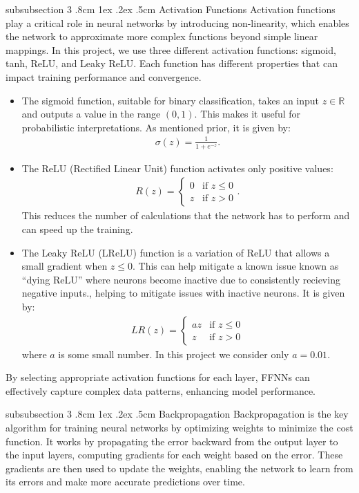 \documentclass[%
reprint,s
amsmath,amssymb,
aps,
]{revtex4-2}
\makeatletter
\renewcommand{\subsubsection}{%
	\@startsection
	{subsubsection}%
	{3}%
	{\z@}%
	{.8cm \@plus1ex \@minus .2ex}%
	{.5cm}%
	{\normalfont\small\centering}%
}
\makeatother
\begin{document}
\subsubsection{Activation Functions}
Activation functions play a critical role in neural networks by introducing non-linearity, which enables the network to approximate more complex functions beyond simple linear mappings. In this project, we use three different activation functions: sigmoid, tanh, ReLU, and Leaky ReLU. Each function has different properties that can impact training performance and convergence.
\begin{itemize}
	\item The sigmoid function, suitable for binary classification, takes an input $z\in\mathbb{R}$ and outputs a value in the range $(0,1)$. This makes it useful for probabilistic interpretations. As mentioned prior, it is given by:
	\begin{align} 
		\sigma(z)=\frac{1}{1+e^{-z}}.
	\end{align}
	\item The ReLU (Rectified Linear Unit) function activates only positive values: 
	\begin{align} 
		R(z)=
		\begin{cases}
			0 & \text{if }z\leq0\\z&\text{if }z>0
		\end{cases}.
	\end{align}
	This reduces the number of calculations that the network has to perform and can speed up the training.
	\item The Leaky ReLU (LReLU) function is a variation of ReLU that allows a small gradient when $z\leq0$. This can help mitigate a known issue known as ``dying ReLU'' where neurons become inactive due to consistently recieving negative inputs., helping to mitigate issues with inactive neurons. It is given by:
	\begin{align} 
		LR(z)=
		\begin{cases} 
			az&\text{if }z\leq0\\z&\text{if }z> 0 
		\end{cases} 
	\end{align}
	where $a$ is some small number. In this project we consider only $a=0.01$.
\end{itemize}
By selecting appropriate activation functions for each layer, FFNNs can effectively capture complex data patterns, enhancing model performance.

\subsubsection{Backpropagation}
Backpropagation is the key algorithm for training neural networks by optimizing weights to minimize the cost function. It works by propagating the error backward from the output layer to the input layers, computing gradients for each weight based on the error. These gradients are then used to update the weights, enabling the network to learn from its errors and make more accurate predictions over time.
\end{document}
